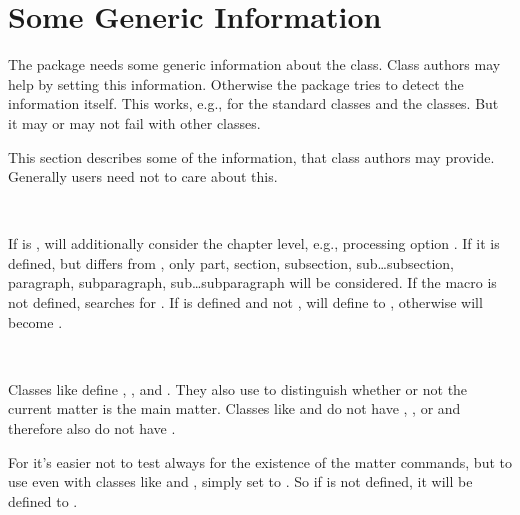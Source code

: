 \section{Some Generic Information}
\label{sec:scrlayer.generic}

The package needs some generic information about the class. Class authors may
help  by setting this information. Otherwise the package tries
to detect the information itself. This works, e.g., for the standard classes
and the \KOMAScript{} classes. But it may or may not fail with other classes.

This section describes some of the information, that class authors may
provide. Generally users need not to care about this.

\begin{Declaration}
  \  \ 
\end{Declaration}
%
If  is ,  will additionally
consider the chapter level, e.g., processing option . If it
is defined, but differs from , only part, section, subsection,
sub\dots subsection, paragraph, subparagraph, sub\dots subparagraph will be
considered. If the macro is not defined,  searches for
. If  is defined and not ,
 will define  to , otherwise
 will become .%

\begin{Declaration}
  \  \ 
\end{Declaration}
%
Classes like  define , , and
. They also use  to distinguish whether
or not the current matter is the main matter. Classes like  and
 do not have , , or
 and therefore also do not have .

For  it's easier not to test always for the existence of the
matter commands, but to use  even with classes like
 and , simply set to . So if
 is not defined, it will be defined to .

